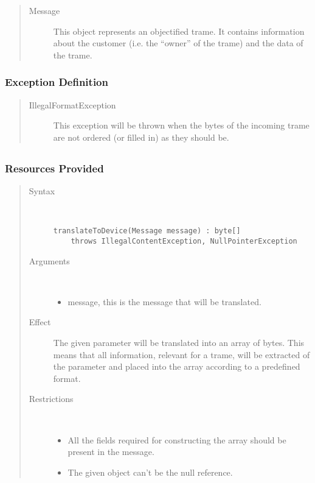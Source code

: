 \begin{quote}
	\begin{description}
		\item[Message] This object represents an objectified trame. It contains
		information about the customer (i.e. the ``owner'' of the trame) and the data
		of the trame.
	\end{description} 
\end{quote}

\subsubsection{Exception Definition} 

\begin{quote}
	\begin{description}
		\item[IllegalFormatException] This exception will be thrown when the bytes of
		the incoming trame are not ordered (or filled in) as they should be.
	\end{description} 
\end{quote}

\subsection{}

\subsubsection{Resources Provided}

\begin{quote}
	\begin{description}
		\item[Syntax] \
		\begin{verbatim}
translateToDevice(Message message) : byte[]
    throws IllegalContentException, NullPointerException
		\end{verbatim}
		\item[Arguments] \
		\begin{itemize}
		  \item message, this is the message that will be translated.
		\end{itemize}
		\item[Effect] The given parameter will be translated into an array of bytes.
		This means that all information, relevant for a trame, will be extracted of
		the parameter and placed into the array according to a predefined format.
		\item[Restrictions] \
		\begin{itemize}
		  \item All the fields required for constructing the array should be present
		  in the message.
		  \item The given object can't be the null reference.
		\end{itemize}
	\end{description} 
\end{quote}

